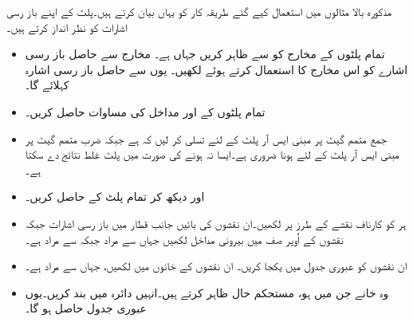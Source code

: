 مذکورہ بالا  مثالوں میں استعمال کیے گئے طریقہ کار کو یہاں بیان کرتے ہیں۔پلٹ کے اپنے باز رسی اشارات  کو  نظر انداز کرتے ہیں۔
\begin{itemize}
\item
     تمام پلٹوں کے مخارج کو   سے ظاہر کریں جہاں ہے۔ مخارج سے  حاصل باز رسی اشارے کو اس مخارج کا    استعمال کرتے ہوئے   لکھیں۔ یوں  سے حاصل باز رسی اشارہ  کہلائے گا۔
\item
     تمام پلٹوں کے   اور  مداخل کی مساوات حاصل کریں۔
\item
     جمع  متمم گیٹ پر مبنی ایس آر  پلٹ کے لئے تسلی کر لیں کہ   ہے جبکہ ضرب  متمم گیٹ پر مبنی ایس آر پلٹ کے لئے   ہونا ضروری ہے۔ایسا نہ ہونے کی صورت میں پلٹ غلط نتائج دے سکتا ہے۔
\item    
{}      اور   دیکھ کر  تمام پلٹ کے  حاصل کریں۔
\item
     ہر  کو کارناف نقشے کے طرز پر  لکھیں۔ان نقشوں کی  بائیں جانب قطار میں باز رسی اشارات   جبکہ نقشوں کے اُوپر صف میں بیرونی مداخل   لکھیں جہاں  سے مراد   جبکہ   سے مراد   ہے۔
\item
     ان  نقشوں کو عبوری جدول میں یکجا کریں۔ ان نقشوں   کے خانوں میں  لکھیں، جہاں   سے مراد  ہے۔
\item
     وہ خانے جن  میں   ہو، مستحکم حال  ظاہر کرتے ہیں۔انہیں دائرہ میں بند کریں۔یوں عبوری جدول حاصل ہو گا۔
\end{itemize}

